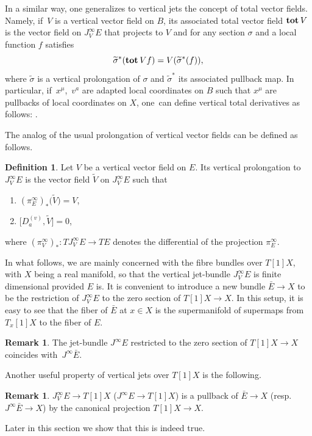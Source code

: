 \documentclass[pdftex]{sigma}
\numberwithin{equation}{section}
\theoremstyle{definition}
\newtheorem{Definition}[Theorem]{Definition}
\newtheorem{Remark}[Theorem]{Remark}
\renewcommand{\tilde}{\widetilde}
\renewcommand{\d}{\partial}
\newcommand{\ffrac}[2]{\raisebox{.5pt}%
 {\footnotesize$\displaystyle\frac{#1}{#2}$}\kern1pt}
\newcommand{\dl}[1]{\mathchoice{\ffrac{\d}{\d #1}}{\frac{\d}{\d #1}}{\ffrac{\d}{\d #1}}{\ffrac{\d}{\d #1}}}
\newcommand{\total}{\textbf{tot\,}}
\newcommand{\vprol}{\tilde}
\begin{document}
In a similar way, one generalizes to vertical jets the concept of total vector fields. Namely, if~$V$ is a vertical vector field on $B$, its associated total vector field $\total{V}$ is the vector field on $J^{\infty}_VE$ that projects to $V$ and for any section $\sigma$ and a local function $f$ satisfies
\begin{equation*}
 \vprol{\sigma}^*(\total{V}f)=V (\vprol{\sigma}^* (f)),
\end{equation*}
where $\vprol{\sigma}$ is a vertical prolongation of $\sigma$ and $\vprol{\sigma}^*$ its associated pullback map. In particular, if~$x^\mu$,~$v^a$ are adapted local coordinates on $B$ such that $x^\mu$ are pullbacks of local coordinates on $X$, one~can define vertical total derivatives  as follows: \smash{$D^{(v)}_a=\total{\dl{v^a}}$}.

The analog of the usual prolongation of vertical vector fields can be defined as follows.

\begin{Definition}%
 Let $V$ be a vertical vector field on $E$. Its vertical prolongation to $J^{\infty}_VE$ is the vector field $\vprol{V}$ on $J^{\infty}_VE$ such that
 \begin{enumerate}\itemsep=0pt
 \item[(1)] $(\pi^{\infty}_E)_*\bigl(\vprol{V}\bigr)=V$,
 \item[(2)] $\bigl[D^{(v)}_a,\vprol{V}\bigr]=0$,
 \end{enumerate}
 where $(\pi^{\infty}_V)_*\colon TJ^{\infty}_VE\rightarrow TE$ denotes the differential of the projection $\pi^{\infty}_E$.
\end{Definition}

In what follows, we are mainly concerned with the fibre bundles over $T[1]X$, with $X$ being a real manifold, so that the vertical jet-bundle $J_V^\infty E$ is finite dimensional provided $E$ is. It is convenient to introduce a new bundle $\bar E \to X$ to be the restriction of $J^\infty_V E$ to the zero section of $T[1]X\to X$. In this setup, it is easy to see that the fiber of $\bar E$ at $x\in X$ is the supermanifold of supermaps from $T_x[1]X$ to the fiber of $E$.
\begin{Remark}
The jet-bundle $J^\infty E$ restricted to the zero section of $T[1]X\to X$ coincides with~${J^\infty \bar E}$.
\end{Remark}
Another useful property of vertical jets over $T[1]X$ is the following.

\begin{Remark}\label{rem:pullback}
$J_V^\infty E \to T[1]X$ ($J^\infty E\to T[1]X$) is a pullback of $\bar E \to X$ \big(resp.\ $J^\infty \bar E \to X$\big) by the canonical projection $T[1]X\to X$.
\end{Remark}
Later in this section we show that this is indeed true.
\end{document}
